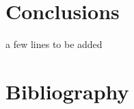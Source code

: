 \documentclass[times, twoside]{PosWhiPap}
\begin{document}
\section*{Conclusions}
a few lines to be added




















\newpage

\section*{Bibliography}

\end{document}

